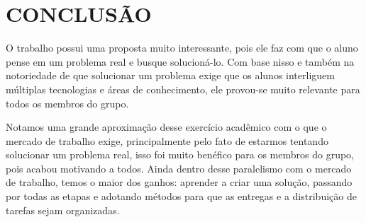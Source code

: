 \chapter{CONCLUSÃO}
\label{chap:conclusao}







O trabalho possui uma proposta muito interessante, pois ele faz com que o aluno pense em um problema real e busque solucioná-lo. Com base nisso e também na notoriedade de que solucionar um problema exige que os alunos interliguem múltiplas tecnologias e áreas de conhecimento, ele provou-se muito relevante para todos os membros do grupo.

Notamos uma grande aproximação desse exercício acadêmico com o que o mercado de trabalho exige, principalmente pelo fato de estarmos tentando solucionar um problema real, isso foi muito benéfico para os membros do grupo, pois acabou motivando a todos. Ainda dentro desse paralelismo com o mercado de trabalho, temos o maior dos ganhos: aprender a criar uma solução, passando por todas as etapas e adotando métodos para que as entregas e a distribuição de tarefas sejam organizadas.

